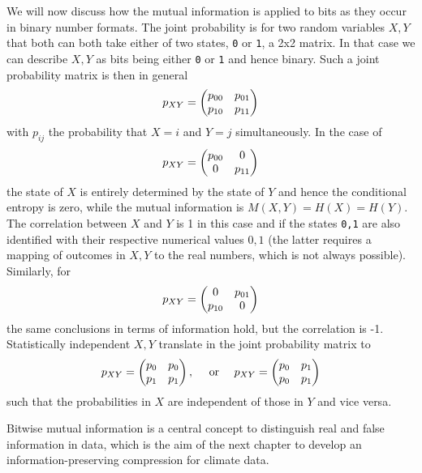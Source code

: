 We will now discuss how the mutual information is applied to bits as they occur in binary number formats. The joint probability
is for two random variables $X,Y$ that both can both take either of two states, \texttt{0} or \texttt{1},
a 2x2 matrix. In that case we can describe $X,Y$ as bits being either \texttt{0} or \texttt{1} and hence binary.
Such a joint probability matrix is then in general
\begin{equation}
	p_{XY} = \begin{pmatrix} p_{00} & p_{01} \\
			p_{10} & p_{11} \end{pmatrix}
\end{equation}
with $p_{ij}$ the probability that $X=i$ and $Y=j$ simultaneously.
In the case of 
\begin{equation}
	p_{XY} = \begin{pmatrix} p_{00} & 0 \\
			0 & p_{11} \end{pmatrix}
\end{equation}
the state of $X$ is entirely determined by the state of $Y$ and hence the conditional entropy is zero, while the mutual information
is $M(X,Y) = H(X) = H(Y)$. The correlation between $X$ and $Y$ is 1 in this case and if the states \texttt{0,1} are also identified
with their respective numerical values $0,1$ (the latter requires a mapping of outcomes in $X,Y$ to the real numbers, which 
is not always possible). Similarly, for
\begin{equation}
	p_{XY} = \begin{pmatrix} 0 & p_{01} \\
			p_{10} & 0 \end{pmatrix}
\end{equation}
the same conclusions in terms of information hold, but the correlation is -1. Statistically independent $X,Y$ translate in the joint
probability matrix to
\begin{equation}
	p_{XY} = \begin{pmatrix} p_0 & p_0 \\
			p_1 & p_1 \end{pmatrix},
	\quad \text{ or } \quad
	p_{XY} = \begin{pmatrix} p_0 & p_1 \\
			p_0 & p_1 \end{pmatrix}
\end{equation}
such that the probabilities in $X$ are independent of those in $Y$ and vice versa.

Bitwise mutual information is a central concept to distinguish real and false information in data, which is the aim of the next chapter
to develop an information-preserving compression for climate data.
